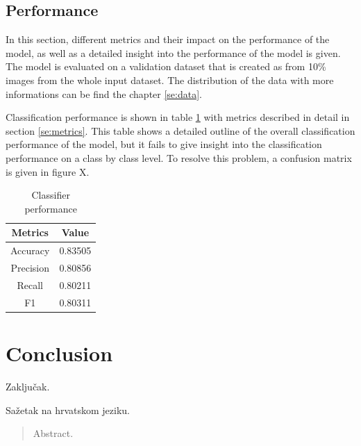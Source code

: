\documentclass[times, utf8, diplomski]{fer}
\begin{document}
\section{Performance}

In this section, different metrics and their impact on the performance of the model, as well as a detailed insight into the performance of the model is given. The model is evaluated on a validation dataset that is created as from 10\% images from the whole input dataset. The distribution of the data with more informations can be find the chapter \ref{se:data}.

Classification performance is shown in table \ref{tb:classifier_performance} with metrics described in detail in section \ref{se:metrics}. This table shows a detailed outline of the overall classification performance of the model, but it fails to give insight into the classification performance on a class by class level. To resolve this problem, a confusion matrix is given in figure X.


\begin{table}
\centering
\caption{Classifier performance}
\label{tb:classifier_performance}
\begin{tabular}{cc}
\hline 
Metrics & Value \\ \hline 
Accuracy &  0.83505\\ 
Precision & 0.80856 \\ 
Recall & 0.80211 \\
F1 & 0.80311 \\
\hline 
\end{tabular} 
\end{table}

\chapter{Conclusion}
Zaključak.





\begin{sazetak}
Sažetak na hrvatskom jeziku.

\end{sazetak}

\begin{abstract}
Abstract.

\end{abstract}
\end{document}
